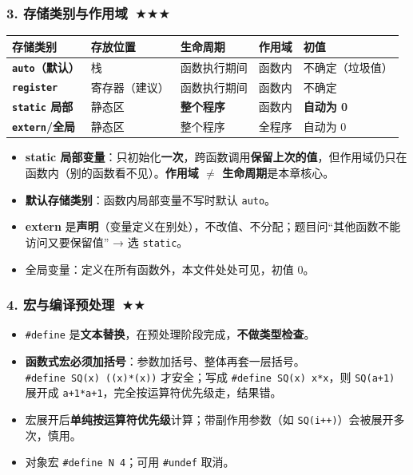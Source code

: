 \documentclass[UTF8,zihao=-4,a4paper]{ctexart}
\newcommand{\cstar}{\textcolor{deepred}{$\bigstar$}}
\begin{document}
\subsubsection*{3. 存储类别与作用域\ \cstar\cstar\cstar}
\begin{center}\small
\begin{tabularx}{\linewidth}{>{\bfseries}p{2.7cm} p{2.6cm} p{2.6cm} p{2.0cm} X}
\toprule
存储类别 & 存放位置 & 生命周期 & 作用域 & 初值\\
\midrule
\texttt{auto}（默认） & 栈 & 函数执行期间 & 函数内 & 不确定（垃圾值）\\
\texttt{register} & 寄存器（建议） & 函数执行期间 & 函数内 & 不确定\\
\texttt{static} 局部 & 静态区 & \textbf{整个程序} & 函数内 & \textbf{自动为 0}\\
\texttt{extern}/全局 & 静态区 & 整个程序 & 全程序 & 自动为 0\\
\bottomrule
\end{tabularx}
\end{center}
\begin{itemize}
  \item \textbf{static 局部变量}：只初始化\textbf{一次}，跨函数调用\textbf{保留上次的值}，但作用域仍只在函数内（别的函数看不见）。\textbf{作用域 $\neq$ 生命周期}是本章核心。
  \item \textbf{默认存储类别}：函数内局部变量不写时默认 \texttt{auto}。
  \item \textbf{extern} 是\textbf{声明}（变量定义在别处），不改值、不分配；题目问“其他函数不能访问又要保留值” → 选 \texttt{static}。
  \item 全局变量：定义在所有函数外，本文件处处可见，初值 0。
\end{itemize}

\subsubsection*{4. 宏与编译预处理\ \cstar\cstar}
\begin{itemize}
  \item \texttt{\#define} 是\textbf{文本替换}，在预处理阶段完成，\textbf{不做类型检查}。
  \item \textbf{函数式宏必须加括号}：参数加括号、整体再套一层括号。\\
  \texttt{\#define SQ(x) ((x)*(x))} 才安全；写成 \texttt{\#define SQ(x) x*x}，则 \texttt{SQ(a+1)} 展开成 \texttt{a+1*a+1}，完全按运算符优先级走，结果错。
  \item 宏展开后\textbf{单纯按运算符优先级}计算；带副作用参数（如 \texttt{SQ(i++)}）会被展开多次，慎用。
  \item 对象宏 \texttt{\#define N 4}；可用 \texttt{\#undef} 取消。
\end{itemize}
\end{document}
